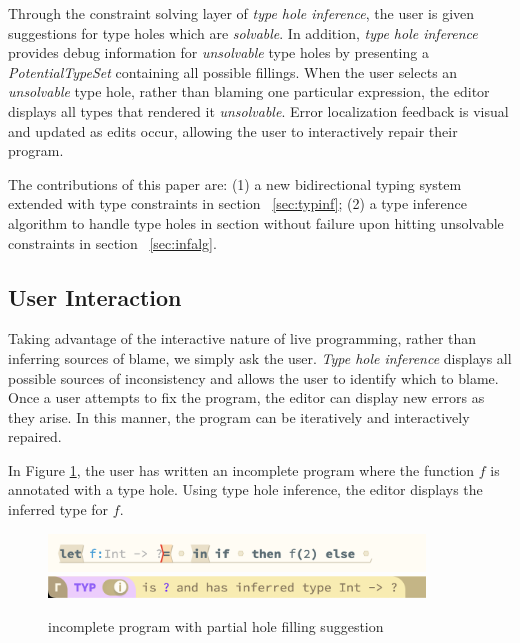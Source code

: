 Through the constraint solving layer of \emph{type hole inference}, the user is given suggestions for type holes which are \textit{solvable}. In addition, \emph{type hole inference} provides debug information for \emph{unsolvable} type holes by presenting a \emph{PotentialTypeSet} containing all possible fillings. When the user selects an \emph{unsolvable} type hole, rather than blaming one particular expression, the editor displays all types that rendered it \emph{unsolvable}. Error localization feedback is visual and updated as edits occur, allowing the user to interactively repair their program.

The contributions of this paper are: (1) a new bidirectional typing system extended with type constraints in section ~\ref{sec:typinf}; (2) a type inference algorithm to handle type holes in section without failure upon hitting unsolvable constraints in section ~\ref{sec:infalg}.

\subsection{User Interaction}

Taking advantage of the interactive nature of live programming, rather than inferring sources of blame, we simply ask the user. \emph{Type hole inference} displays all possible sources of inconsistency and allows the user to identify which to blame. Once a user attempts to fix the program, the editor can display new errors as they arise. In this manner, the program can be iteratively and interactively repaired.

In Figure \ref{fig:editor_holes}, the user has written an incomplete program where the function $f$ is annotated with a type hole. Using type hole inference, the editor displays the inferred type for $f$. 

\begin{figure}[H]
\includegraphics[width=10cm]{images/example_holes.png}
\includegraphics[width=10cm]{images/example_holes_CI.png}
\caption{incomplete program with partial hole filling suggestion}
\label{fig:editor_holes}
\end{figure}


